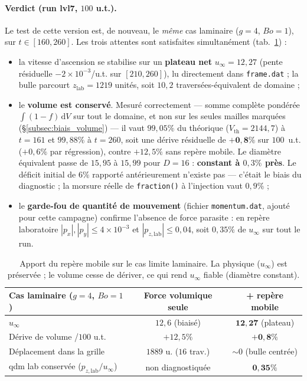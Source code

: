 \paragraph{Verdict (run lvl7, $100$ u.t.).} Le test de cette version est, de
nouveau, le \emph{même} cas laminaire ($g=4$, $Bo=1$), sur $t\in[160,260]$. Les
trois attentes sont satisfaites simultanément (tab.~\ref{tab:frame_verdict}) :
\begin{itemize}
    \item la vitesse d'ascension se stabilise sur un \textbf{plateau net}
    $u_\infty = 12{,}27$ (pente résiduelle $-2\times10^{-3}$/u.t. sur $[210,260]$),
    lu directement dans \texttt{frame.dat} ; la bulle parcourt $z_{\text{lab}}=1219$
    unités, soit $10{,}2$ traversées-équivalent de domaine ;
    \item le \textbf{volume est conservé}. Mesuré correctement --- somme complète
    pondérée $\int(1-f)\,\mathrm{d}V$ sur tout le domaine, et non sur les seules
    mailles marquées (\S\ref{subsec:biais_volume}) --- il vaut $99{,}05\%$ du
    théorique ($V_{\text{th}}=2144{,}7$) à $t=161$ et $99{,}88\%$ à $t=260$, soit une
    dérive résiduelle de $\mathbf{+0{,}8\%}$ sur $100$~u.t. ($+0{,}6\%$ par
    régression), contre $+12{,}5\%$ sans repère mobile. Le diamètre équivalent passe
    de $15{,}95$ à $15{,}99$ pour $D=16$ : \textbf{constant à $0{,}3\%$ près}. Le
    \og{}déficit initial de $6\%$\fg{} rapporté antérieurement n'existe pas --- c'était
    le biais du diagnostic ; la morsure réelle de \texttt{fraction()} à l'injection
    vaut $0{,}9\%$ ;
    \item le \textbf{garde-fou de quantité de mouvement} (fichier
    \texttt{momentum.dat}, ajouté pour cette campagne) confirme l'absence de force
    parasite : en repère laboratoire $|p_x|,|p_y|\le4\times10^{-3}$ et
    $|p_{z,\text{lab}}|\le0{,}04$, soit $0{,}35\%$ de $u_\infty$ sur tout le run.
\end{itemize}

\begin{table}[htbp]
    \centering
    \renewcommand{\arraystretch}{1.3}
    \begin{tabular}{lcc}
        \toprule
        Cas laminaire ($g=4$, $Bo=1$) & Force volumique seule & \textbf{+ repère mobile} \\
        \midrule
        $u_\infty$ & $12{,}6$ (biaisé) & $\mathbf{12{,}27}$ (plateau) \\
        Dérive de volume /$100$ u.t. & $+12{,}5\%$ & $\mathbf{+0{,}8\%}$ \\
        Déplacement dans la grille & $1889$ u. ($16$ trav.) & ${\sim}0$ (bulle centrée) \\
        qdm lab conservée ($p_{z,\text{lab}}/u_\infty$) & non diagnostiquée & $\mathbf{0{,}35\%}$ \\
        \bottomrule
    \end{tabular}
    \caption{Apport du repère mobile sur le cas limite laminaire. La physique
    ($u_\infty$) est préservée ; le volume cesse de dériver, ce qui rend $u_\infty$
    fiable (diamètre constant).}
    \label{tab:frame_verdict}
\end{table}

